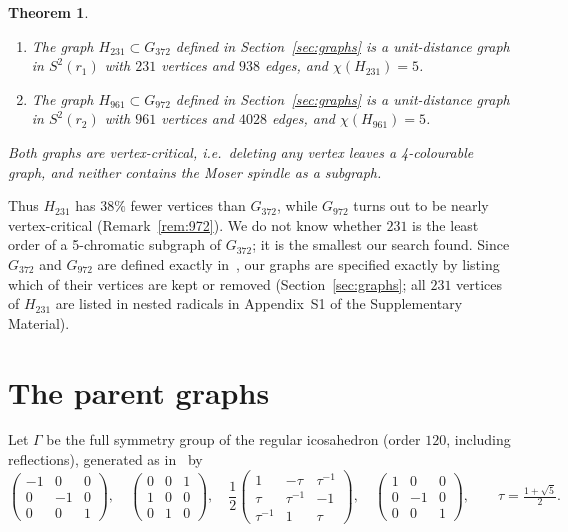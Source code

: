 \documentclass[11pt]{article}
\newtheorem{theorem}{Theorem}
\theoremstyle{remark}
\begin{document}
\begin{theorem}\label{thm:main}
\begin{enumerate}
  \item[(a)] The graph $H_{231}\subset G_{372}$ defined in Section~\ref{sec:graphs} is a unit-distance
  graph in $S^2(r_1)$ with $231$ vertices and $938$ edges, and $\chi(H_{231})=5$.
  \item[(b)] The graph $H_{961}\subset G_{972}$ defined in Section~\ref{sec:graphs} is a unit-distance
  graph in $S^2(r_2)$ with $961$ vertices and $4028$ edges, and $\chi(H_{961})=5$.
\end{enumerate}
Both graphs are vertex-critical, i.e.\ deleting any vertex leaves a 4-colourable graph, and neither
contains the Moser spindle as a subgraph.
\end{theorem}

Thus $H_{231}$ has $38\%$ fewer vertices than $G_{372}$, while $G_{972}$ turns out to be nearly
vertex-critical (Remark~\ref{rem:972}). We do not know whether $231$ is the least order of a 5-chromatic
subgraph of $G_{372}$; it is the smallest our search found. Since $G_{372}$ and $G_{972}$ are defined exactly
in~\cite{VND2022}, our graphs are specified exactly by listing which of their vertices are kept or
removed (Section~\ref{sec:graphs}; all $231$ vertices of $H_{231}$ are listed in nested radicals in Appendix~S1 of the Supplementary Material).

\section{The parent graphs}\label{sec:parents}

Let $\Gamma$ be the full symmetry group of the regular icosahedron (order $120$, including reflections),
generated as in~\cite{VNDrepo} by
\[
\begin{pmatrix}-1&0&0\\0&-1&0\\0&0&1\end{pmatrix},\quad
\begin{pmatrix}0&0&1\\1&0&0\\0&1&0\end{pmatrix},\quad
\frac12\begin{pmatrix}1&-\tau&\tau^{-1}\\ \tau&\tau^{-1}&-1\\ \tau^{-1}&1&\tau\end{pmatrix},\quad
\begin{pmatrix}1&0&0\\0&-1&0\\0&0&1\end{pmatrix},
\qquad \tau=\tfrac{1+\sqrt5}{2}.
\]
\end{document}
